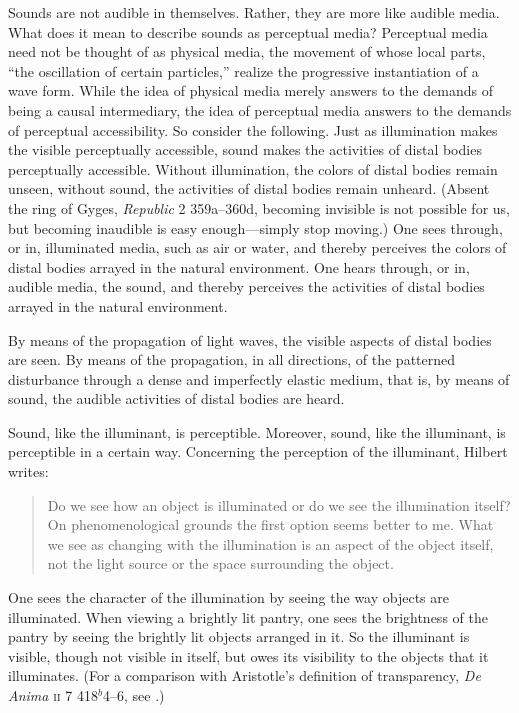 Sounds are not audible in themselves. Rather, they are more like audible media. What does it mean to describe sounds as perceptual media? Perceptual media need not be thought of as physical media, the movement of whose local parts, ``the oscillation of certain particles,'' realize the progressive instantiation of a wave form. While the idea of physical media merely answers to the demands of being a causal intermediary, the idea of perceptual media answers to the demands of perceptual accessibility. So consider the following. Just as illumination makes the visible perceptually accessible, sound makes the activities of distal bodies perceptually accessible. Without illumination, the colors of distal bodies remain unseen, without sound, the activities of distal bodies remain unheard. (Absent the ring of Gyges, \emph{Republic} 2 359a--360d, becoming invisible is not possible for us, but becoming inaudible is easy enough---simply stop moving.) One sees through, or in, illuminated media, such as air or water, and thereby perceives the colors of distal bodies arrayed in the natural environment. One hears through, or in, audible media, the sound, and thereby perceives the activities of distal bodies arrayed in the natural environment.

By means of the propagation of light waves, the visible aspects of distal bodies are seen. By means of the propagation, in all directions, of the patterned disturbance through a dense and imperfectly elastic medium, that is, by means of sound, the audible activities of distal bodies are heard.

Sound, like the illuminant, is perceptible. Moreover, sound, like the illuminant, is perceptible in a certain way. Concerning the perception of the illuminant, Hilbert writes:
\begin{quote}
	Do we see how an object is illuminated or do we see the illumination itself? On phenomenological grounds the first option seems better to me. What we see as changing with the illumination is an aspect of the object itself, not the light source or the space surrounding the object. \citep[150--151]{Hilbert:2007qy}
\end{quote}
One sees the character of the illumination by seeing the way objects are illuminated. When viewing a brightly lit pantry, one sees the brightness of the pantry by seeing the brightly lit objects arranged in it. So the illuminant is visible, though not visible in itself, but owes its visibility to the objects that it illuminates. (For a comparison with Aristotle's definition of transparency, \emph{De Anima} \textsc{ii} 7 418\( ^{b} \)4--6, see \citealt[41--42]{Kalderon:2015fr}.)

